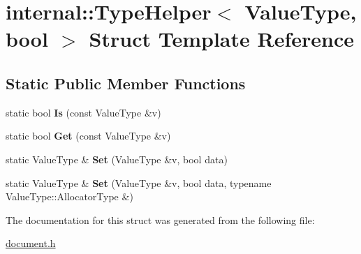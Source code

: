 \hypertarget{a00311}{}\section{internal\+:\+:Type\+Helper$<$ Value\+Type, bool $>$ Struct Template Reference}
\label{a00311}
\subsection*{Static Public Member Functions}
\begin{DoxyCompactItemize}
\item 
static bool {\bfseries Is} (const Value\+Type \&v)\hypertarget{a00311_aa73fb8b4ed649706f7f9165401f89c27}{}\label{a00311_aa73fb8b4ed649706f7f9165401f89c27}

\item 
static bool {\bfseries Get} (const Value\+Type \&v)\hypertarget{a00311_aed612b233e5985d049248b414fb0034a}{}\label{a00311_aed612b233e5985d049248b414fb0034a}

\item 
static Value\+Type \& {\bfseries Set} (Value\+Type \&v, bool data)\hypertarget{a00311_a4bfa644e57e7d725468ed78103c1579a}{}\label{a00311_a4bfa644e57e7d725468ed78103c1579a}

\item 
static Value\+Type \& {\bfseries Set} (Value\+Type \&v, bool data, typename Value\+Type\+::\+Allocator\+Type \&)\hypertarget{a00311_a01a2bdf4117fb767c8d703be9e0f5f1d}{}\label{a00311_a01a2bdf4117fb767c8d703be9e0f5f1d}

\end{DoxyCompactItemize}


The documentation for this struct was generated from the following file\+:\begin{DoxyCompactItemize}
\item 
\hyperlink{a00473}{document.\+h}\end{DoxyCompactItemize}
